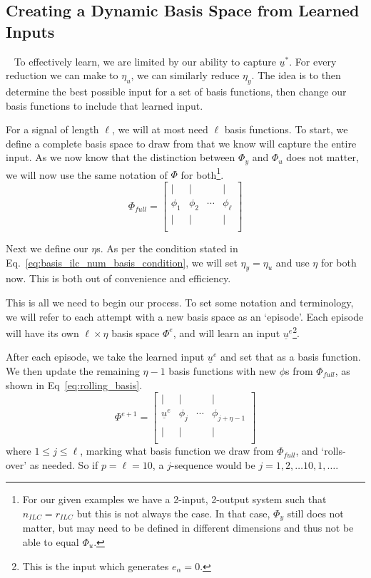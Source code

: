 \FloatBarrier\subsection{Creating a Dynamic Basis Space from Learned Inputs}
~\label{sub:dynamic_arb_basis}
To effectively learn, we are limited by our ability to capture $\underline{u}^\ast$. For every reduction we can make to $\eta_u$, we can similarly reduce $\eta_y$. The idea is to then determine the best possible input for a set of basis functions, then change our basis functions to include that learned input. 

For a signal of length $\ell$, we will at most need $\ell$ basis functions. To start, we define a complete basis space to draw from that we know will capture the entire input. As we now know that the distinction between $\Phi_y$ and $\Phi_u$ does not matter, we will now use the same notation of $\Phi$ for both\footnote{For our given examples we have a 2-input, 2-output system such that $n_{ILC} = r_{ILC}$ but this is not always the case. In that case, $\Phi_y$ still does not matter, but may need to be defined in different dimensions and thus not be able to equal $\Phi_u$.}.
\begin{equation}
    \Phi_{full} =
    \begin{bmatrix}
        | & | &  & | \\
        \phi_1 & \phi_2 & \cdots & \phi_{\ell} \\
        | & | &  & | \\
    \end{bmatrix}
    \label{eq:full_basis_space_phi}
\end{equation}

Next we define our $\eta$s. As per the condition stated in Eq.~\ref{eq:basis_ilc_num_basis_condition}, we will set $\eta_y = \eta_u$ and use $\eta$ for both now. This is both out of convenience and efficiency.

This is all we need to begin our process. To set some notation and terminology, we will refer to each attempt with a new basis space as an `episode'. Each episode will have its own $\ell \times \eta$ basis space $\Phi^e$, and will learn an input $\underline{u}^e$\footnote{This is the input which generates $e_\alpha = 0$.}.

After each episode, we take the learned input $\underline{u}^e$ and set that as a basis function. We then update the remaining $\eta - 1$ basis functions with new $\phi$s from $\Phi_{full}$, as shown in Eq~\ref{eq:rolling_basis}.
\begin{equation}
    \Phi^{e+1} =
    \begin{bmatrix}
        | & | &  & | \\
        \underline{u}^e & \phi_j & \cdots & \phi_{j+\eta-1} \\
        | & | &  & | \\
    \end{bmatrix}
    \label{eq:rolling_basis}
\end{equation}
where $1 \leq j \leq \ell$, marking what basis function we draw from $\Phi_{full}$, and `rolls-over' as needed. So if $p=\ell=10$, a $j$-sequence would be $j = 1, 2, \dots 10, 1, \dots$.

